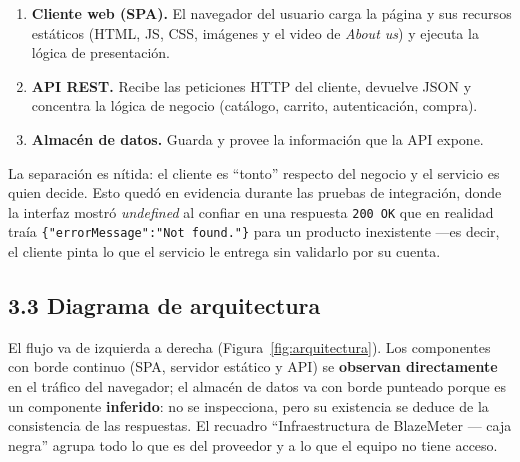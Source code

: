 \begin{enumerate}
  \item \textbf{Cliente web (SPA).} El navegador del usuario carga la página y sus
        recursos estáticos (HTML, JS, CSS, imágenes y el video de \emph{About us}) y
        ejecuta la lógica de presentación.
  \item \textbf{API REST.} Recibe las peticiones HTTP del cliente, devuelve JSON y
        concentra la lógica de negocio (catálogo, carrito, autenticación, compra).
  \item \textbf{Almacén de datos.} Guarda y provee la información que la API expone.
\end{enumerate}

La separación es nítida: el cliente es ``tonto'' respecto del negocio y el servicio es
quien decide. Esto quedó en evidencia durante las pruebas de integración, donde la
interfaz mostró \emph{undefined} al confiar en una respuesta \texttt{200 OK} que en
realidad traía \texttt{\{"errorMessage":"Not found."\}} para un producto inexistente
—es decir, el cliente pinta lo que el servicio le entrega sin validarlo por su cuenta.

\subsection*{3.3 Diagrama de arquitectura}

El flujo va de izquierda a derecha (Figura~\ref{fig:arquitectura}). Los componentes con
borde continuo (SPA, servidor estático y API) se \textbf{observan directamente} en el
tráfico del navegador; el almacén de datos va con borde punteado porque es un
componente \textbf{inferido}: no se inspecciona, pero su existencia se deduce de la
consistencia de las respuestas. El recuadro ``Infraestructura de BlazeMeter — caja
negra'' agrupa todo lo que es del proveedor y a lo que el equipo no tiene acceso.

